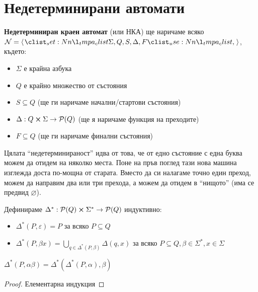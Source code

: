 \section{Недетерминирани автомати}

\begin{definition}
    \textbf{Недетерминиран краен автомат} (или НКА) ще наричаме всяко $\mathcal{N} = \opair{\Sigma, Q, S, \Delta, F}$, където:
    \begin{itemize}
        \item $\Sigma$ е крайна азбука
        \item $Q$ е крайно множество от състояния
        \item $S \subseteq Q$ (ще ги наричаме начални/стартови състояния)
        \item $\Delta : Q \cross \Sigma \rightarrow \mathcal{P}(Q)$ (ще я наричаме функция на преходите)
        \item $F \subseteq Q$ (ще ги наричаме финални състояния)
    \end{itemize}
\end{definition}

Цялата ``недетерминираност'' идва от това, че от едно състояние с една буква можем да отидем на няколко места.
Поне на пръв поглед тази нова машина изглежда доста по-мощна от старата.
Вместо да си налагаме точно един преход, можем да направим два или три прехода, а можем да отидем в ``нищото'' (има се предвид $\varnothing$).

\begin{definition}
    Дефинираме $\Delta^* : \mathcal{P}(Q) \cross \Sigma^* \rightarrow \mathcal{P}(Q)$ индуктивно:
    \begin{itemize}
        \item $\Delta^*(P, \varepsilon) = P$ за всяко $P \subseteq Q$
        \item $\Delta^*(P, \beta x) = \bigcup\limits_{q \in \Delta^*(P, \beta)}\Delta(q, x)$ за всяко $P \subseteq Q, \beta \in \Sigma^*, x \in \Sigma$
    \end{itemize}
\end{definition}

\begin{claim}
    $\Delta^*(P, \alpha \beta) = \Delta^*(\Delta^*(P, \alpha), \beta)$
\end{claim}

\begin{proof}
    Елементарна индукция
\end{proof}

